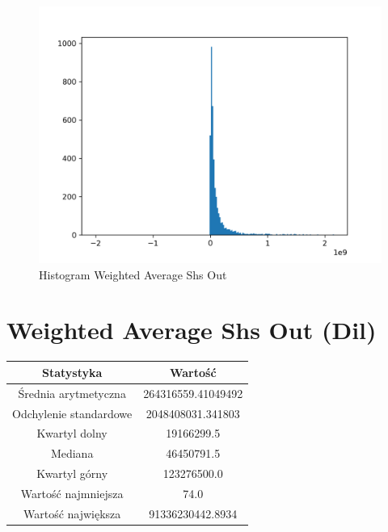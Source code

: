 \documentclass{article}
\begin{document}
\begin{figure}[h!]
    \includegraphics[width=\linewidth]{variables/Weighted Average Shs Out.png}
    \caption{Histogram Weighted Average Shs Out }
\end{figure}\section{ Weighted Average Shs Out (Dil) }

\begin{center}
    \begin{tabular}{|c | c|} 
    \hline
    Statystyka & Wartość \\
    \hline\hline
    Średnia arytmetyczna & 264316559.41049492 \\ 
    \hline
    Odchylenie standardowe & 2048408031.341803 \\
    \hline
    Kwartyl dolny & 19166299.5 \\
    \hline
    Mediana & 46450791.5 \\
    \hline
    Kwartyl górny & 123276500.0 \\
    \hline
    Wartość najmniejsza & 74.0 \\
    \hline
    Wartość największa & 91336230442.8934 \\
    \hline
   \end{tabular}
\end{center}
\end{document}

